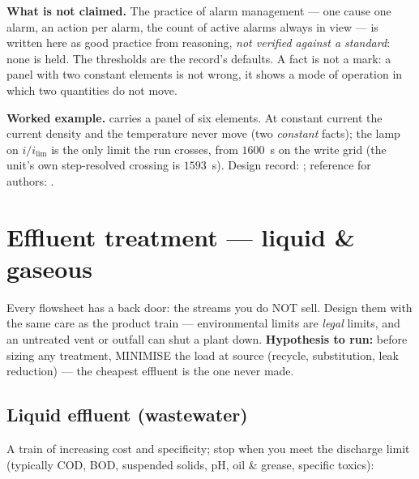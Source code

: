 \documentclass[11pt,a4paper]{article}
\begin{document}
\textbf{What is not claimed.} The practice of alarm management --- one
cause one alarm, an action per alarm, the count of active alarms always in
view --- is written here as good practice from reasoning, \emph{not
verified against a standard}: none is held. The thresholds are the
record's defaults. A fact is not a mark: a panel with two constant elements
is not wrong, it shows a mode of operation in which two quantities do not
move.

\textbf{Worked example.}  carries a panel
of six elements. At constant current the current density and the
temperature never move (two \emph{constant} facts); the lamp on
$i/i_{\text{lim}}$ is the only limit the run crosses, from $1600$~s on the
write grid (the unit's own step-resolved crossing is $1593$~s). Design
record: ; reference for
authors: .

\hypertarget{effluent-treatment--liquid--gaseous}{%
\section{Effluent treatment --- liquid \&
gaseous}\label{effluent-treatment--liquid--gaseous}}

Every flowsheet has a back door: the streams you do NOT sell. Design
them with the same care as the product train --- environmental limits
are \emph{legal} limits, and an untreated vent or outfall can shut a
plant down. \textbf{Hypothesis to run:} before sizing any treatment,
MINIMISE the load at source (recycle, substitution, leak reduction) ---
the cheapest effluent is the one never made.

\hypertarget{liquid-effluent-wastewater}{%
\subsection{Liquid effluent
(wastewater)}\label{liquid-effluent-wastewater}}

A train of increasing cost and specificity; stop when you meet the
discharge limit (typically COD, BOD, suspended solids, pH, oil \&
grease, specific toxics):
\end{document}
